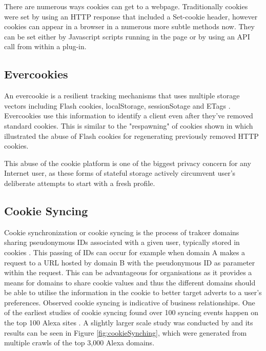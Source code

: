 \documentclass{article}
\begin{document}
There are numerous ways cookies can get to a webpage. Traditionally cookies were set by using an HTTP response that included a Set-cookie header, however cookies can appear in a browser in a numerous more subtle methods now. They can be set either by Javascript scripts running in the page or by using an API call from within a plug-in. 

\subsection{Evercookies}
An evercookie is a resilient tracking mechanisms that uses multiple storage vectors including Flash cookies, localStorage, sessionSotage and ETags \parencite{evercookies}. Evercookies use this information to identify a client even after they've removed standard cookies. This is similar to the "respawning" of cookies shown in \parencite{flashCookiesPrivacy} which illustrated the abuse of Flash cookies for regenerating previously removed HTTP cookies. \newline

This abuse of the cookie platform is one of the biggest privacy concern for any Internet user, as these forms of stateful storage actively circumvent user's deliberate attempts to start with a fresh profile. 

\subsection{Cookie Syncing}
Cookie synchronization or cookie syncing is the process of trakcer domains sharing pseudonymous IDs associated with a given user, typically stored in cookies \parencite{webNeverForgets}. This passing of IDs can occur for example when domain A makes a request to a URL hosted by domain B with the pseudonymous ID as parameter within the request. This can be advantageous for organisations as it provides a means for domains to share cookie values and thus the different domains should be able to utilise the information in the cookie to better target adverts to a user's preferences. Observed cookie syncing is indicative of business relationships.  One of the earliest studies of cookie syncing found over 100 syncing events happen on the top 100 Alexa sites \parencite{sellingPrivacy}. A slightly larger scale study was conducted by \parencite{webNeverForgets} and its results can be seen in Figure \ref{fig:cookieSynching}, which were generated from multiple crawls of the top 3,000 Alexa domains. 
\end{document}
